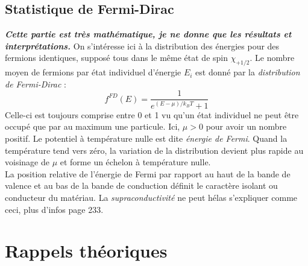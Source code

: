 \documentclass[british,french,11pt, a4paper, openany]{book}
\begin{document}
\section{Statistique de Fermi-Dirac}
\textit{\textbf{Cette partie est très mathématique, je ne donne que les résultats et interprétations.}}
On s'intéresse ici à la distribution des énergies pour des fermions identiques, supposé tous dans le 
même état de spin $\chi_{+1/2}$. Le nombre moyen de fermions par état individuel d'énergie $E_i$ est 
donné par la \textit{distribution de Fermi-Dirac} :
\begin{equation}
	f^{FD}(E) = \frac{1}{e^{(E-\mu)/k_BT}+1}
\end{equation}
Celle-ci est toujours comprise entre 0 et 1 vu qu'un état individuel ne peut être occupé que par au 
maximum une particule. Ici, $\mu > 0$ pour avoir un nombre positif. Le potentiel à température nulle 
est dite \textit{énergie de Fermi}. Quand la température tend vers zéro, la variation de la distribution
devient plus rapide au voisinage de $\mu$ et forme un échelon à température nulle. \\
La position relative de l'énergie de Fermi par rapport au haut de la bande de valence et au bas de la bande
de conduction définit le caractère isolant ou conducteur du matériau. La \textit{supraconductivité} ne peut 
hélas s'expliquer comme ceci, plus d'infos page 233.

	
	
	
	\appendix
	\chapter{Rappels théoriques}
	
	
	
	
	
	
	
	
	
	
	
\end{document}

